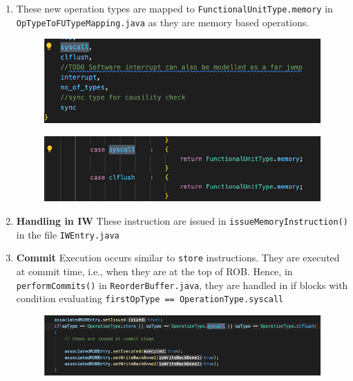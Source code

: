 \documentclass[11pt]{article}
\begin{document}
\begin{enumerate}
    \item These new operation types are mapped to \texttt{FunctionalUnitType.memory} in \texttt{OpTypeToFUTypeMapping.java} as they are memory based operations.
\begin{figure}
\centering
\begin{minipage}{.5\textwidth}
  \centering
  \includegraphics[width=0.9\linewidth]{screenshots/OperationType.png}
  \label{fig:IC}
\end{minipage}%
\begin{minipage}{.55\textwidth}
  \centering
  \includegraphics[width=1\linewidth]{screenshots/OpTypeToFUTypeMapping.png}
  \label{fig:ICT2}
\end{minipage}
\end{figure}    
    \item \textbf{Handling in IW} These instruction are issued in \texttt{issueMemoryInstruction()} in the file \texttt{IWEntry.java}
    \item \textbf{Commit} Execution occurs similar to \texttt{store} instructions. They are executed at commit time, i.e., when they are at the top of ROB. Hence, in \texttt{performCommits()} in \texttt{ReorderBuffer.java}, they are handled in if blocks with condition evaluating \texttt{firstOpType == OperationType.syscall}
\begin{figure}[H]
\centering
\includegraphics[scale = 0.8]{screenshots/IWWrite1.png}

\end{figure}
\end{enumerate}
\end{document}
